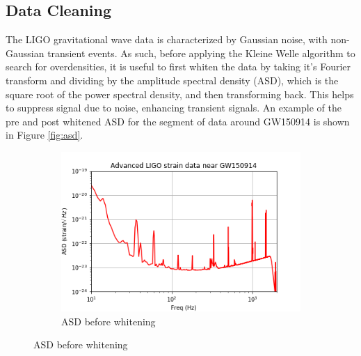 \documentclass{article}
\begin{document}
\subsection{Data Cleaning}
The LIGO gravitational wave data is characterized by Gaussian noise, with non-Gaussian transient events. As such, before applying the Kleine Welle algorithm to search for overdensities, it is useful to first whiten the data by taking it's Fourier transform and dividing by the amplitude spectral density (ASD), which is the square root of the power spectral density, and then transforming back\citep{LIGOScientificCollaboration}. This helps to suppress signal due to noise, enhancing transient signals. An example of the pre and post whitened ASD for the segment of data around GW150914 is shown in Figure \ref{fig:asd}.

\begin{figure}
\begin{subfigure}{\textwidth}
\includegraphics[width=\textwidth]{GW150914_prewhite.png}
\caption{ASD before whitening}
\label{fig:prewhite}
\end{subfigure}


\end{figure}
\end{document}
